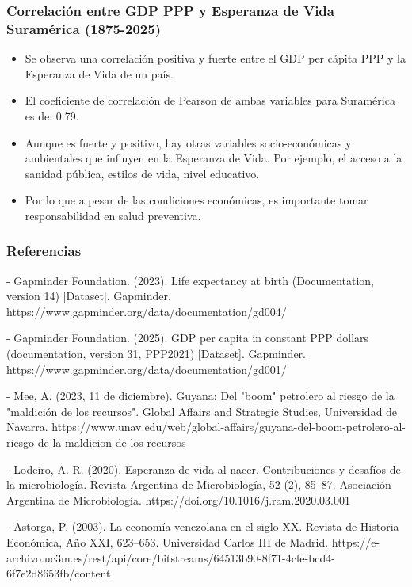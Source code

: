 \documentclass{beamer}
\begin{document}
\begin{frame}[fragile]
\frametitle{Correlación entre GDP  PPP y Esperanza de Vida Suramérica (1875-2025)}

\begin{itemize}
\item<1> Se observa una correlación positiva y fuerte entre el GDP per cápita PPP y la Esperanza de Vida de un país.

\item<2> El coeficiente de correlación de Pearson de ambas variables para Suramérica es de: 0.79.

\item<3> Aunque es fuerte y positivo, hay otras variables socio-económicas y ambientales que influyen en la Esperanza de Vida. Por ejemplo, el acceso a la sanidad pública, estilos de vida, nivel educativo.

\item<4> Por lo que a pesar de las condiciones económicas, es importante tomar responsabilidad en salud preventiva.

\end{itemize}
\end{frame}


\begin{frame}[fragile]
\frametitle{Referencias}

{\scriptsize
- Gapminder Foundation. (2023). Life expectancy at birth (Documentation, version 14) [Dataset]. Gapminder. https://www.gapminder.org/data/documentation/gd004/

- Gapminder Foundation. (2025). GDP per capita in constant PPP dollars (documentation, version 31, PPP2021) [Dataset]. Gapminder. https://www.gapminder.org/data/documentation/gd001/

- Mee, A. (2023, 11 de diciembre). Guyana: Del "boom" petrolero al riesgo de la "maldición de los recursos". Global Affairs and Strategic Studies, Universidad de Navarra. https://www.unav.edu/web/global-affairs/guyana-del-boom-petrolero-al-riesgo-de-la-maldicion-de-los-recursos

- Lodeiro, A. R. (2020). Esperanza de vida al nacer. Contribuciones y desafíos de la microbiología. Revista Argentina de Microbiología, 52 (2), 85–87. Asociación Argentina de Microbiología. https://doi.org/10.1016/j.ram.2020.03.001

- Astorga, P. (2003). La economía venezolana en el siglo XX. Revista de Historia Económica, Año XXI, 623–653. Universidad Carlos III de Madrid. https://e-archivo.uc3m.es/rest/api/core/bitstreams/64513b90-8f71-4cfe-bcd4-6f7e2d8653fb/content
}

\end{frame}
\end{document}
